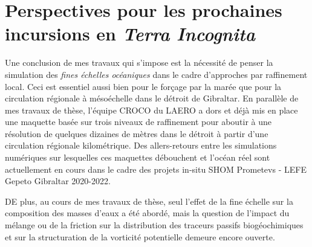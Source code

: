 \section{Perspectives pour les prochaines incursions en \textit{Terra Incognita}}
Une conclusion de mes travaux qui s'impose est la nécessité de penser la simulation des \textit{fines échelles océaniques} dans le cadre d'approches par raffinement local. Ceci est essentiel aussi bien pour le forçage par la marée que pour la circulation régionale à mésoéchelle dans le détroit de Gibraltar. En parallèle de mes travaux de thèse, l'équipe CROCO du LAERO a dors et déjà mis en place une maquette basée sur trois niveaux de raffinement pour aboutir à une résolution de quelques dizaines de mètres dans le détroit à partir d'une circulation régionale kilométrique. Des allers-retours entre les simulations numériques sur lesquelles ces maquettes débouchent et l'océan réel sont actuellement en cours dans le cadre des projets in-situ SHOM Prometevs - LEFE Gepeto Gibraltar 2020-2022.

DE plus, au cours de mes travaux de thèse, seul l'effet de la fine échelle sur la composition des masses d'eaux a été abordé, mais la question de l'impact du mélange ou de la friction sur la distribution des traceurs passifs biogéochimiques \citep{penney_2020} et sur la structuration de la vorticité potentielle \citep{morel_potential_2019} demeure encore ouverte.

